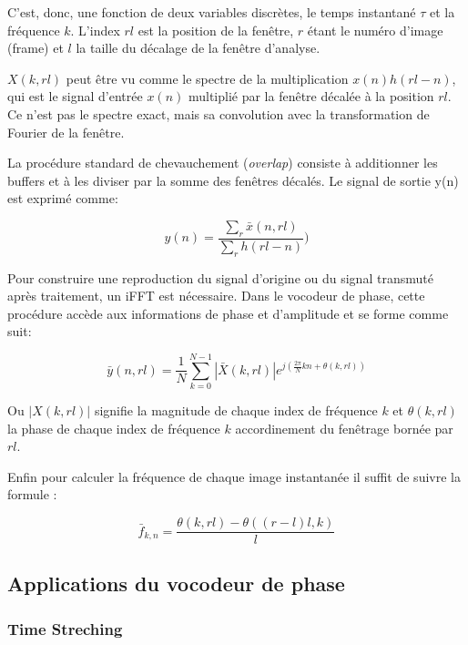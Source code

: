C’est, donc, une fonction de deux variables discrètes, le temps instantané $\tau$ et la fréquence $k$. L’index $rl$ est la position de la fenêtre, $r$ étant le numéro d’image (frame) et $l$ la taille du décalage de la fenêtre d’analyse.

$ X (k, rl) $ peut être vu comme le spectre de la multiplication $ x (n) h (rl-n) $, qui est le signal d'entrée $ x (n) $ multiplié par la fenêtre décalée à la position $ rl $. Ce n'est pas le spectre exact, mais sa convolution avec la transformation de Fourier de la fenêtre.

La procédure standard de chevauchement (\textit{overlap}) consiste à additionner les buffers et à les diviser par la somme des fenêtres décalés. Le signal de sortie y(n) est exprimé comme:

\begin{equation}
    y(n) = \frac{\sum_r \bar{x}(n, rl)}{\sum_r {h}(rl - n)})
\end{equation}

Pour construire une reproduction du signal d'origine ou du signal transmuté après traitement, un iFFT est nécessaire. Dans le vocodeur de phase, cette procédure accède aux informations de phase et d'amplitude et se forme comme suit:

\begin{equation}
    \bar{y}(n, rl) = \frac{1}{N}\sum_{k=0}^{N-1} |\bar{X}(k, rl)| e^{j (\frac{2 \pi}{N} k n  + \theta(k, rl))}
\end{equation}

Ou $|X(k, rl)|$ signifie la magnitude de chaque index de fréquence $k$ et $\theta(k, rl)$ la phase de chaque index de fréquence $k$ accordinement du fenêtrage bornée par $rl$.

Enfin pour calculer la fréquence de chaque image instantanée il suffit de suivre la formule :

\begin{equation}
    \bar{f}_{k,n} = \frac{\theta(k, rl) - \theta((r - l )l, k)}{l}
\end{equation}

\subsection{Applications du vocodeur de phase} 

    \subsubsection{Time Streching}

